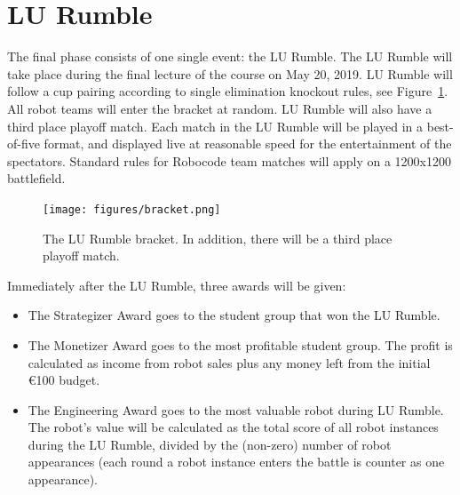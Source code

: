 \documentclass{scrreprt}
\begin{document}
\section{LU Rumble} \label{sec:rumble}
The final phase consists of one single event: the LU Rumble. The LU Rumble will take place during the final lecture of the course on May 20, 2019. LU Rumble will follow a cup pairing according to single elimination knockout rules, see Figure~\ref{fig:bracket}. All robot teams will enter the bracket at random. LU Rumble will also have a third place playoff match. Each match in the LU Rumble will be played in a best-of-five format, and displayed live at reasonable speed for the entertainment of the spectators. Standard rules for Robocode team matches will apply on a 1200x1200 battlefield. 


\begin{figure}
\centering
\texttt{[image: figures/bracket.png]}
\caption{The LU Rumble bracket. In addition, there will be a third place playoff match.}
\label{fig:bracket}
\end{figure}

Immediately after the LU Rumble, three awards will be given:
\begin{itemize}
\item The Strategizer Award goes to the student group that won the LU Rumble.
\item The Monetizer Award goes to the most profitable student group. The profit is calculated as income from robot sales plus any money left from the initial \euro100 budget. 
\item The Engineering Award goes to the most valuable robot during LU Rumble. The robot's value will be calculated as the total score of all robot instances during the LU Rumble, divided by the (non-zero) number of robot appearances (each round a robot instance enters the battle is counter as one appearance).
\end{itemize}
\end{document}
